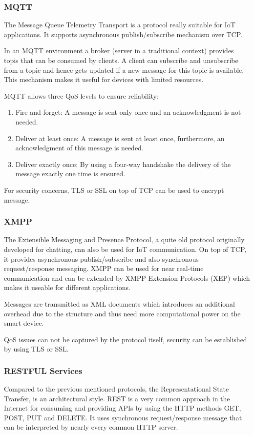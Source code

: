 \subsubsection{MQTT}
The Message Queue Telemetry Transport is a protocol really suitable for IoT applications. It supports asynchronous publish/subscribe mechanism over TCP.

In an MQTT environment a broker (server in a traditional context) provides topis that can be consumed by clients. A client can subscribe and unsubscribe from a topic and hence gets updated if a new message for this topic is available. This mechanism makes it useful for devices with limited resources.

MQTT allows three QoS levels to ensure reliability:

\begin{enumerate}
	\item Fire and forget: A message is sent only once and an acknowledgment is not needed.
	\item Deliver at least once: A message is sent at least once, furthermore, an acknowledgment of this message is needed.
	\item Deliver exactly once: By using a four-way handshake the delivery of the message exactly one time is ensured.
\end{enumerate}

For security concerns, TLS or SSL on top of TCP can be used to encrypt message.

\subsubsection{XMPP}
The Extensible Messaging and Presence Protocol, a quite old protocol originally developed for chatting, can also be used for IoT communication. On top of TCP, it provides asynchronous publish/subscribe and also synchronous request/response messaging. XMPP can be used for near real-time communication and can be extended by XMPP Extension Protocols (XEP) which makes it useable for different applications.

Messages are transmitted as XML documents which introduces an additional overhead due to the structure and thus need more computational power on the smart device.

QoS issues can not be captured by the protocol itself, security can be established by using TLS or SSL.

\subsubsection{RESTFUL Services}
Compared to the previous mentioned protocols, the Representational State Transfer, is an architectural style. REST is a very common approach in the Internet for consuming and providing APIs by using the HTTP methods GET, POST, PUT and DELETE. It uses synchronous request/response message that can be interpreted by nearly every common HTTP server.

